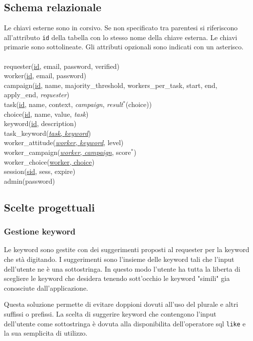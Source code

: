 \documentclass[a4paper]{article}
\begin{document}
\subsection{Schema relazionale}
Le chiavi esterne sono in corsivo. Se non specificato tra parentesi si riferiscono all'attributo \verb|id| della tabella con lo stesso nome della chiave esterna. Le chiavi primarie sono sottolineate. Gli attributi opzionali sono indicati con un asterisco.
\\\\
requester(\underline{id}, email, password, verified)
\\
worker(\underline{id}, email, password)
\\
campaign(\uline{id}, name, majority\_threshold, workers\_per\_task, start, end, apply\_end, \textit{requester})
\\
task(\uline{id}, name, context, \textit{campaign}, \textit{result}$^*$(choice))
\\
choice(\uline{id}, name, value, \textit{task})
\\
keyword(\uline{id}, description)
\\
task\_keyword(\uline{\textit{task}, \textit{keyword}})
\\
worker\_attitude(\uline{\textit{worker}, \textit{keyword}}, level)
\\
worker\_campaign(\uline{\textit{worker}, \textit{campaign}}, score$^{*}$)
\\
worker\_choice(\uline{worker, choice})
\\
session(\uline{sid}, sess, expire)
\\
admin(password)

\subsection{Scelte progettuali}
\subsubsection{Gestione keyword}
Le keyword sono gestite con dei suggerimenti proposti al requester per la keyword che st\`a digitando.
I suggerimenti sono l'insieme delle keyword tali che l'input dell'utente ne è una sottostringa.
In questo modo l'utente ha tutta la liberta di scegliere le keyword che desidera tenendo sott'occhio le keyword "simili" gia conosciute dall'applicazione.

Questa soluzione permette di evitare doppioni dovuti all'uso del plurale e altri suffissi o prefissi.
La scelta di suggerire keyword che contengono l'input dell'utente come sottostringa è dovuta alla disponibilita dell'operatore sql \verb|like| e la sua semplicita di utilizzo.
\end{document}
